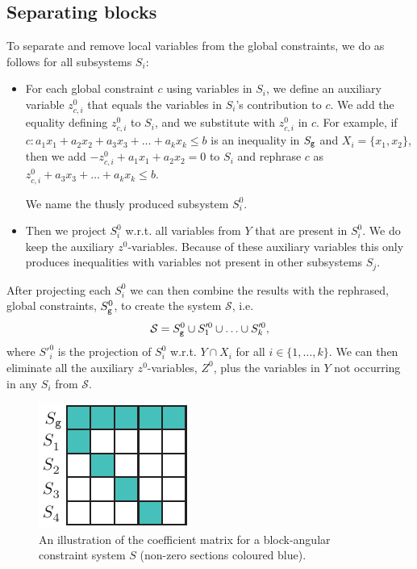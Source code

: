 \subsection{Separating blocks}%
To separate and remove local variables from the global constraints, we do as follows for all subsystems $S_i$:
\begin{itemize}\itemsep0em
\item For each global constraint $c$ using variables in $S_i$, we define an auxiliary variable $z^0_{c,i}$ that equals the variables in $S_i$'s contribution to $c$. We add the equality defining $z^0_{c,i}$ to $S_i$, and we substitute with $z^0_{c,i}$ in $c$. For example, if $c: a_1x_1 + a_2x_2 + a_3x_3 + \ldots + a_kx_k \leq b$ is an inequality in $S_{\texttt{g}}$ and $X_i = \{x_1,x_2\}$, then we add $-z^0_{c,i} + a_1x_1 + a_2x_2 = 0$ to $S_i$ and rephrase $c$ as $z^0_{c,i} + a_3x_3 + \ldots + a_kx_k \leq b$. 

We name the thusly produced subsystem $S_i^0$. 
\item Then we project $S_i^0$ w.r.t. all variables from $Y$ that are present in $S_i^0$. We do keep the auxiliary $z^0$-variables. 
Because of these auxiliary variables this only produces inequalities with variables not present in other subsystems $S_j$. 
\end{itemize}
After projecting each $S_i^0$ we can then combine the results with the rephrased, global constraints, $S_{\texttt{g}}^0$, to create the system $\mathcal{S}$, i.e. 
\begin{equation}\label{eq:curlyS}
\mathcal{S} = S^0_{\texttt{g}} \cup S'^0_1\cup \ldots \cup S'^0_k,
\end{equation}
where $S'^0_i$ is the projection of $S^0_i$ w.r.t. $Y\cap X_i$ for all $i\in\{1,\ldots, k\}$.
We can then eliminate all the auxiliary $z^0$-variables, $Z^0$, plus the variables in $Y$ not occurring in any $S_i$ from $\mathcal{S}$. %

\begin{figure}[htbp]
	\centering
		\includegraphics{figures/blockStructure.pdf}
	\caption{An illustration of the coefficient matrix for a block-angular constraint system $S$ (non-zero sections coloured blue).}
	\label{fig:decomp}
\end{figure}


